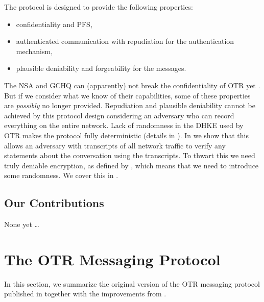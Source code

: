 The protocol is designed to provide the following properties:
\begin{itemize}
  \item confidentiality and \ac{PFS},
  \item authenticated communication with repudiation for the authentication 
    mechanism,
  \item plausible deniability and forgeability for the messages.
\end{itemize}
The \ac{NSA} and \ac{GCHQ} can (apparently) not break the confidentiality of 
\ac{OTR} yet \cite{spiegelotr}.
But if we consider what we know of their capabilities, some of these properties 
are \emph{possibly} no longer provided.
Repudiation and plausible deniability cannot be achieved by this protocol 
design considering an adversary who can record everything on the entire 
network.
Lack of randomness in the \ac{DHKE} \cite{dh} used by \ac{OTR} makes 
the protocol fully deterministic (details in ).
In  we show that this allows an adversary with 
transcripts of all network traffic to verify any statements about the 
conversation using the transcripts.
To thwart this we need truly deniable encryption, as defined by 
\citet{deniablecrypt}, which means that we need to introduce some randomness.
We cover this in .

\subsection{Our Contributions}

None yet \dots


\section{The \acs{OTR} Messaging Protocol}
\label{sec:otr}

In this section, we summarize the original version of the \ac{OTR} messaging 
protocol published in \cite{otr2004} together with the improvements from 
\cite{di2005secure}.

